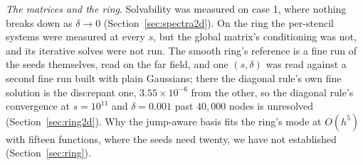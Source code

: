 \documentclass[11pt]{amsart}
\theoremstyle{definition}
\theoremstyle{remark}
\newcommand{\para}[1]{\par\smallskip\noindent\textit{#1}.\enspace}
\newcommand{\sci}[2]{#1 \times 10^{#2}}
\begin{document}
\para{The matrices and the ring}
Solvability was measured on case 1, where nothing breaks down as
$\delta \to 0$ (Section~\ref{sec:spectra2d}). On the ring the per-stencil
systems were measured at every $s$, but the global
matrix's conditioning was not, and its iterative solves were not run. The
smooth ring's reference is a fine run of the seeds themselves, read on the
far field, and one $(s, \delta)$ was read against a second fine run built
with plain Gaussians; there the diagonal rule's own fine solution is the discrepant
one, $\sci{3.55}{-6}$ from the other, so the diagonal rule's convergence at
$s = 10^{11}$ and $\delta = 0.001$ past $40{,}000$ nodes is unresolved
(Section~\ref{sec:ring2d}). Why the jump-aware basis fits the ring's mode at
$O(h^5)$ with fifteen functions, where the seeds need twenty, we have not
established (Section~\ref{sec:ring}).
\end{document}
